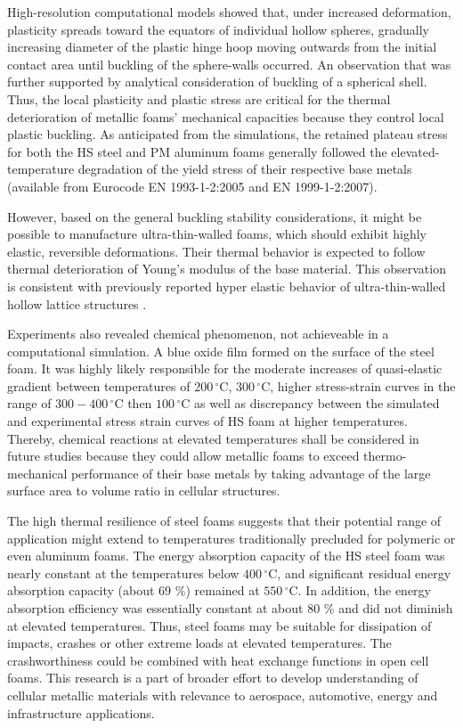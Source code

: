 \documentclass[review]{elsarticle}
\begin{document}
{High-resolution computational models showed that, under increased deformation, plasticity spreads toward the equators of individual hollow spheres, gradually increasing diameter of the plastic hinge hoop moving outwards from the initial contact area until buckling of the sphere-walls occurred. An observation that was further supported by analytical consideration of buckling of a spherical shell. Thus, the local plasticity and plastic stress are critical for the thermal deterioration of metallic foams’ mechanical capacities because they control local plastic buckling. As anticipated from the simulations, the retained plateau stress for both the HS steel and PM aluminum foams generally followed the elevated-temperature degradation of the yield stress of their respective base metals (available from Eurocode EN 1993-1-2:2005 and EN 1999-1-2:2007).

However, based on the general buckling stability considerations, it might be possible to manufacture ultra-thin-walled foams, which should exhibit highly elastic, reversible deformations. Their thermal behavior is expected to follow thermal deterioration of Young's modulus of the base material. This observation is consistent with previously reported hyper elastic behavior of ultra-thin-walled hollow lattice structures \cite{Sch2011}.

Experiments also revealed chemical phenomenon, not achieveable in a computational simulation. A blue oxide film formed on the surface of the steel foam. It was highly likely responsible for the moderate increases of quasi-elastic gradient between temperatures of $200\,^{\circ}\mathrm{C}$, $300\,^{\circ}\mathrm{C}$, higher stress-strain curves in the range of $300-400\,^{\circ}\mathrm{C}$ then $100\,^{\circ}\mathrm{C}$ as well as discrepancy between the simulated and experimental stress strain curves of HS foam at higher temperatures.  Thereby, chemical reactions at elevated temperatures shall be considered in future studies because they could allow metallic foams to exceed thermo-mechanical performance of their base metals by taking advantage of the large surface area to volume ratio in cellular structures.

The high thermal resilience of steel foams suggests that their potential range of application might extend to temperatures traditionally precluded for polymeric or even aluminum foams. The energy absorption capacity of the HS steel foam was nearly constant at the temperatures below $400\,^{\circ}\mathrm{C}$, and significant residual energy absorption capacity (about 69 \%) remained at $550\,^{\circ}\mathrm{C}$. In addition, the energy absorption efficiency was essentially constant at about 80 \% and did not diminish at elevated temperatures. Thus, steel foams may be suitable for dissipation of impacts, crashes or other extreme loads at elevated temperatures. The crashworthiness could be combined with heat exchange functions in open cell foams. This research is a part of broader effort to develop understanding of cellular metallic materials with relevance to aerospace, automotive, energy and infrastructure applications.

}
\end{document}
